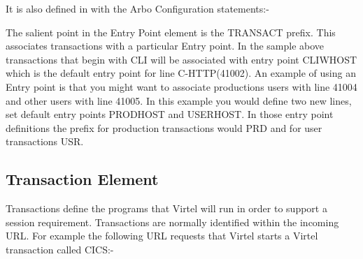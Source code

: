 \documentclass[letterpaper,10pt,english]{sphinxmanual}
\begin{document}

It is also defined in with the Arbo Configuration statements:-

\begin{sphinxVerbatim}[commandchars=\\\{\}]
                                       
           
                                           
                                           
                                               
                                              
                                        
                                          
                                         
\end{sphinxVerbatim}

The salient point in the Entry Point element is the TRANSACT prefix. This associates transactions with a particular Entry point. In the sample above transactions that begin with CLI will be associated with entry point CLIWHOST which is the default entry point for line C-HTTP(41002). An example of using an Entry point is that you might want to associate productions users with line 41004 and other users with line 41005. In this example you would define two new lines, set default entry points PRODHOST and USERHOST. In those entry point definitions the prefix for production transactions would PRD and for user transactions USR.


\subsection{Transaction Element}
\label{\detokenize{connectivity_guide:transaction-element}}
Transactions define the programs that Virtel will run in order to support a session requirement. Transactions are normally identified within the incoming URL. For example the following URL requests that Virtel starts a Virtel transaction called CICS:-
\end{document}
